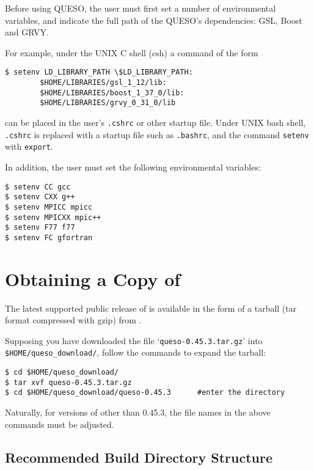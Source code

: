 Before using QUESO, the user must first set a number of environmental variables, and indicate the full path
of the QUESO's dependencies: GSL, Boost and GRVY. 

For example, under the UNIX C shell (csh) a command of the form
\begin{lstlisting}
$ setenv LD_LIBRARY_PATH \$LD_LIBRARY_PATH:
		$HOME/LIBRARIES/gsl_1_12/lib:
		$HOME/LIBRARIES/boost_1_37_0/lib:
		$HOME/LIBRARIES/grvy_0_31_0/lib
\end{lstlisting}
can be placed in the user's \verb+.cshrc+ or other startup file. 
Under UNIX bash shell, {\tt.cshrc} is replaced with a startup file such as {\tt.bashrc}, and the command {\tt setenv} with \texttt{export}.

In addition, the user must set the following environmental
variables:
\begin{lstlisting}
$ setenv CC gcc
$ setenv CXX g++
$ setenv MPICC mpicc
$ setenv MPICXX mpic++
$ setenv F77 f77
$ setenv FC gfortran 
\end{lstlisting}



\section{Obtaining a Copy of \Queso{}}

The latest supported public release of \Queso{} is available in the form of a tarball (tar format compressed with gzip) from \Quesoweb{}.

Supposing you have downloaded the file `\verb+queso-0.45.3.tar.gz+' into \texttt{\$HOME/queso\_download/}, follow the commands to expand the tarball:
\begin{lstlisting}
$ cd $HOME/queso_download/
$ tar xvf queso-0.45.3.tar.gz
$ cd $HOME/queso_download/queso-0.45.3   	#enter the directory 
\end{lstlisting}

Naturally, for versions of \Queso{} other than 0.45.3, the file names in the above commands must be adjusted.


\subsection{Recommended Build Directory Structure}\label{sec:Queso_tree}


